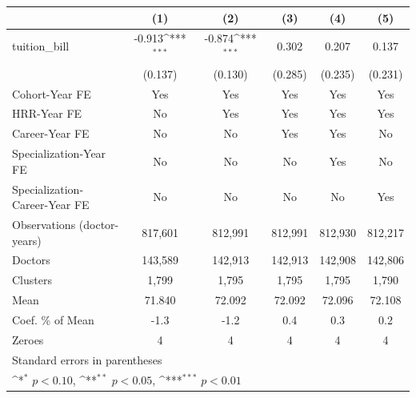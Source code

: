 {
\def\sym#1{\ifmmode^{#1}\else\(^{#1}\)\fi}
\begin{tabular}{l*{5}{c}}
\hline\hline
                    &\multicolumn{1}{c}{(1)}         &\multicolumn{1}{c}{(2)}         &\multicolumn{1}{c}{(3)}         &\multicolumn{1}{c}{(4)}         &\multicolumn{1}{c}{(5)}         \\
\hline
tuition\_bill        &      -0.913\sym{***}&      -0.874\sym{***}&       0.302         &       0.207         &       0.137         \\
                    &     (0.137)         &     (0.130)         &     (0.285)         &     (0.235)         &     (0.231)         \\
[1em]
Cohort-Year FE      &         Yes         &         Yes         &         Yes         &         Yes         &         Yes         \\
[1em]
HRR-Year FE         &          No         &         Yes         &         Yes         &         Yes         &         Yes         \\
[1em]
Career-Year FE      &          No         &          No         &         Yes         &         Yes         &          No         \\
[1em]
Specialization-Year FE&          No         &          No         &          No         &         Yes         &          No         \\
[1em]
Specialization-Career-Year FE&          No         &          No         &          No         &          No         &         Yes         \\
\hline
Observations (doctor-years)&     817,601         &     812,991         &     812,991         &     812,930         &     812,217         \\
Doctors             &     143,589         &     142,913         &     142,913         &     142,908         &     142,806         \\
Clusters            &       1,799         &       1,795         &       1,795         &       1,795         &       1,790         \\
Mean                &      71.840         &      72.092         &      72.092         &      72.096         &      72.108         \\
Coef. \% of Mean    &        -1.3         &        -1.2         &         0.4         &         0.3         &         0.2         \\
Zeroes              &           4         &           4         &           4         &           4         &           4         \\
\hline\hline
\multicolumn{6}{l}{\footnotesize Standard errors in parentheses}\\
\multicolumn{6}{l}{\footnotesize \sym{*} \(p<0.10\), \sym{**} \(p<0.05\), \sym{***} \(p<0.01\)}\\
\end{tabular}
}
